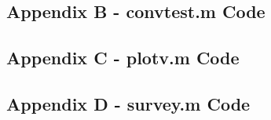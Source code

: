 \documentclass[10pt]{article}
\begin{document}
\pagebreak

\subsection*{Appendix B - convtest.m Code}


\pagebreak

\subsection*{Appendix C - plotv.m Code}


\pagebreak

\subsection*{Appendix D - survey.m Code}


\pagebreak
\end{document}
